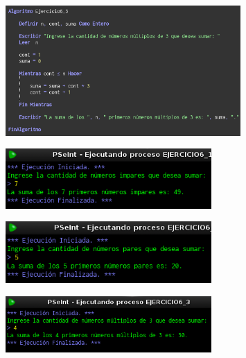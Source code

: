 \documentclass[12pt]{article}
\begin{document}
\begin{enumerate}
                \begin{figure}[!h]
                    \centering
                    \includegraphics[width=0.8\textwidth]{Img/Cod_ej6_3.png}
                \end{figure}

                \begin{figure}[!h]
                    \centering
                    \includegraphics[width=0.7\textwidth]{Img/Ejec_ej6_1.png}
                \end{figure}

                \newpage
                \begin{figure}[!h]
                    \centering
                    \includegraphics[width=0.7\textwidth]{Img/Ejec_ej6_2.png}
                \end{figure}

                \begin{figure}[!h]
                    \centering
                    \includegraphics[width=0.7\textwidth]{Img/Ejec_ej6_3.png}
                \end{figure}
            

\end{enumerate}
\end{document}

